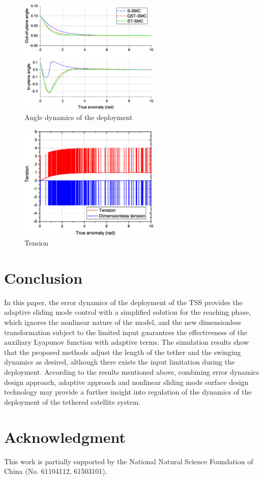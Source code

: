 \documentclass[Journal,letterpaper]{ascelike-new}
\theoremstyle{plain}
\theoremstyle{remark}
\begin{document}
\begin{figure}
\centering
\includegraphics[width=0.6\textwidth]{paper4_fig5.eps}
\caption{Angle dynamics of the deployment}
\label{fig:5}
\end{figure}
\begin{figure}
\centering
\includegraphics[width=0.6\textwidth]{paper4_fig6.eps}
\caption{Tension}
\label{fig:6}
\end{figure}
\section{Conclusion}\label{sec:5}
In this paper, the error dynamics of the deployment of the TSS provides the adaptive sliding mode control with a simplified solution for the reaching phase, which ignores the nonlinear nature of the model, and the new dimensionless transformation subject to the limited input guarantees the effectiveness of the auxiliary Lyapunov function with adaptive terms. The simulation results show that the proposed methods adjust the length of the tether and the swinging dynamics as desired, although there exists the input limitation during the deployment. According to the results mentioned above, combining error dynamics design approach, adaptive approach and nonlinear sliding mode surface design technology may provide a further insight into regulation of the dynamics of the deployment of the tethered satellite system.
\section{Acknowledgment}
This work is partially supported by the National Natural Science Foundation of China (No. 61104112, 61503101).
%
%
%

%
\end{document}
